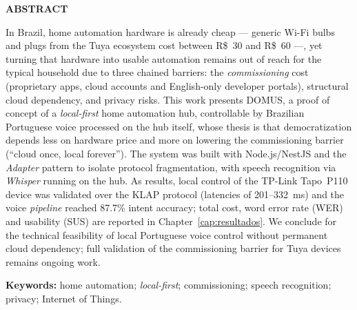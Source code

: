 \newpage
\begin{center}\textbf{ABSTRACT}\end{center}
\vspace{0.4cm}

\noindent
In Brazil, home automation hardware is already cheap --- generic Wi-Fi bulbs and
plugs from the Tuya ecosystem cost between R\$~30 and R\$~60 ---, yet turning that
hardware into usable automation remains out of reach for the typical household due to
three chained barriers: the \textit{commissioning} cost (proprietary apps, cloud
accounts and English-only developer portals), structural cloud dependency, and privacy
risks. This work presents DOMUS, a proof of concept of a \textit{local-first} home
automation hub, controllable by Brazilian Portuguese voice processed on the hub
itself, whose thesis is that democratization depends less on hardware price and more
on lowering the commissioning barrier (``cloud once, local forever''). The system was
built with Node.js/NestJS and the \textit{Adapter} pattern to isolate protocol
fragmentation, with speech recognition via \textit{Whisper} running on the hub. As
results, local control of the TP-Link Tapo~P110 device was validated over the KLAP
protocol (latencies of 201--332~ms) and the voice \textit{pipeline} reached 87.7\%
intent accuracy; total cost, word error rate (WER) and usability (SUS) are reported in
Chapter~\ref{cap:resultados}. We conclude for the technical feasibility of local
Portuguese voice control without permanent cloud dependency; full validation of the
commissioning barrier for Tuya devices remains ongoing work.

\vspace{0.5cm}
\noindent\textbf{Keywords:} home automation; \textit{local-first}; commissioning;
speech recognition; privacy; Internet of Things.
\newpage
